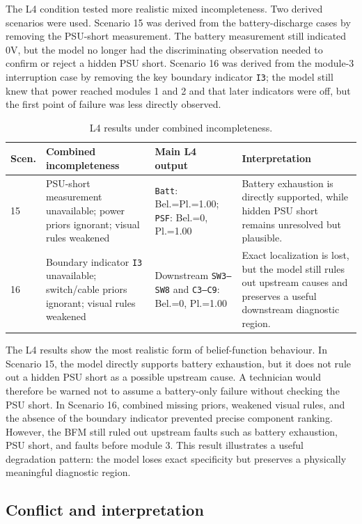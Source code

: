 \documentclass[runningheads]{llncs}
\begin{document}
The L4 condition tested more realistic mixed incompleteness. Two derived scenarios were used. Scenario 15 was derived from the battery-discharge cases by removing the PSU-short measurement. The battery measurement still indicated 0V, but the model no longer had the discriminating observation needed to confirm or reject a hidden PSU short. Scenario 16 was derived from the module-3 interruption case by removing the key boundary indicator \texttt{I3}; the model still knew that power reached modules 1 and 2 and that later indicators were off, but the first point of failure was less directly observed.

\begin{table}[H]
\caption{L4 results under combined incompleteness.}\label{tab:l4_results}
\centering
\small
\begin{tabularx}{\textwidth}{p{0.9cm}p{3.2cm}p{4.0cm}X}
\toprule
Scen. & Combined incompleteness & Main L4 output & Interpretation \\
\midrule
15 & PSU-short measurement unavailable; power priors ignorant; visual rules weakened & \texttt{Batt}: Bel.=Pl.=1.00; \texttt{PSF}: Bel.=0, Pl.=1.00 & Battery exhaustion is directly supported, while hidden PSU short remains unresolved but plausible. \\
16 & Boundary indicator \texttt{I3} unavailable; switch/cable priors ignorant; visual rules weakened & Downstream \texttt{SW3--SW8} and \texttt{C3--C9}: Bel.=0, Pl.=1.00 & Exact localization is lost, but the model still rules out upstream causes and preserves a useful downstream diagnostic region. \\
\bottomrule
\end{tabularx}
\end{table}

The L4 results show the most realistic form of belief-function behaviour. In Scenario 15, the model directly supports battery exhaustion, but it does not rule out a hidden PSU short as a possible upstream cause. A technician would therefore be warned not to assume a battery-only failure without checking the PSU short. In Scenario 16, combined missing priors, weakened visual rules, and the absence of the boundary indicator prevented precise component ranking. However, the BFM still ruled out upstream faults such as battery exhaustion, PSU short, and faults before module 3. This result illustrates a useful degradation pattern: the model loses exact specificity but preserves a physically meaningful diagnostic region.

\subsection{Conflict and interpretation}
\label{sec:conflict_interpretation}
\end{document}
